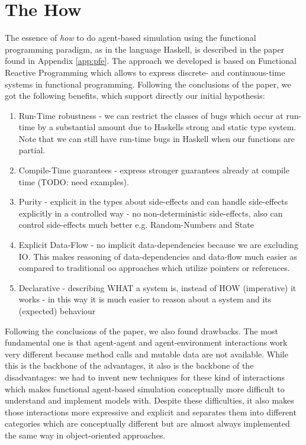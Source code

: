 \section{The How}
The essence of \textit{how} to do agent-based simulation using the functional programming paradigm, as in the language Haskell, is described in the paper found in Appendix \ref{app:pfe}. The approach we developed is based on Functional Reactive Programming which allows to express discrete- and continuous-time systems in functional programming. Following the conclusions of the paper, we got the following benefits, which support directly our initial hypothesis:
\begin{enumerate}
	\item Run-Time robustness - we can restrict the classes of bugs which occur at run-time by a substantial amount due to Haskells strong and static type system. Note that we can still have run-time bugs in Haskell when our functions are partial.
	\item Compile-Time guarantees - express stronger guarantees already at compile time (TODO: need examples).
	\item Purity - explicit in the types about side-effects and can handle side-effects explicitly in a controlled way - no non-deterministic side-effects, also can control side-effects much better e.g. Random-Numbers and State
	\item Explicit Data-Flow - no implicit data-dependencies because we are excluding IO. This makes reasoning of data-dependencies and data-flow much easier as compared to traditional oo approaches which utilize pointers or references.
	\item Declarative - describing WHAT a system is, instead of HOW (imperative) it works - in this way it is much easier to reason about a system and its (expected) behaviour 
\end{enumerate}

Following the conclusions of the paper, we also found drawbacks. The most fundamental one is that agent-agent and agent-environment interactions work very different because method calls and mutable data are not available. While this is the backbone of the advantages, it also is the backbone of the disadvantages: we had to invent new techniques for these kind of interactions which makes functional agent-based simulation conceptually more difficult to understand and implement models with. Despite these difficulties, it also makes those interactions more expressive and explicit and separates them into different categories which are conceptually different but are almost always implemented the same way in object-oriented approaches.

